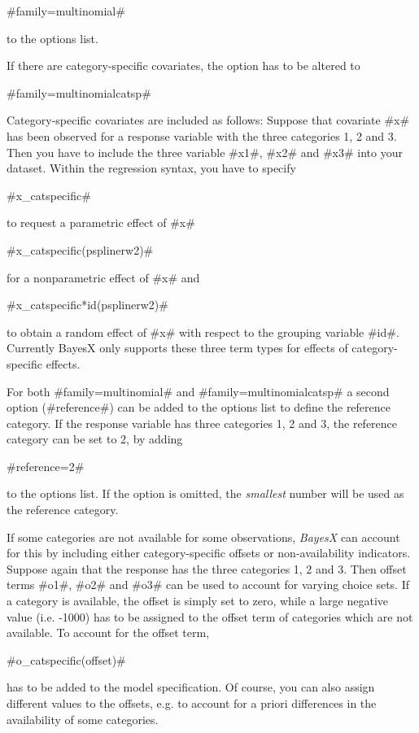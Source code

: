 #family=multinomial#

to the options list.

If there are category-specific covariates, the option has to be
altered to

#family=multinomialcatsp#

Category-specific covariates are included as follows: Suppose that
covariate #x# has been observed for a response variable with the
three categories 1, 2 and 3. Then you have to include the three
variable #x1#, #x2# and #x3# into your dataset. Within the
regression syntax, you have to specify

#x_catspecific#

to request a parametric effect of #x#

#x_catspecific(psplinerw2)#

for a nonparametric effect of #x# and

#x_catspecific*id(psplinerw2)#

to obtain a random effect of #x# with respect to the grouping
variable #id#. Currently BayesX only supports these three term types
for effects of category-specific effects.

For both #family=multinomial# and #family=multinomialcatsp# a second
option (#reference#) can be added to the options list to define the
reference category.  If the response variable has three categories
1, 2 and 3, the reference category can be set to 2, by adding

#reference=2#

to the options list. If the option is omitted, the {\em smallest}
number will be used as the reference category.

 If some categories are not available
for some observations, {\em BayesX} can account for this by
including either category-specific offsets or non-availability
indicators. Suppose again that the response has the three categories
1, 2 and 3. Then offset terms #o1#, #o2# and #o3# can be used to
account for varying choice sets. If a category is available, the
offset is simply set to zero, while a large negative value (i.e.
-1000) has to be assigned to the offset term of categories which are
not available. To account for the offset term,

#o_catspecific(offset)#

has to be added to the model specification. Of course, you can also
assign different values to the offsets, e.g. to account for a priori
differences in the availability of some categories.


